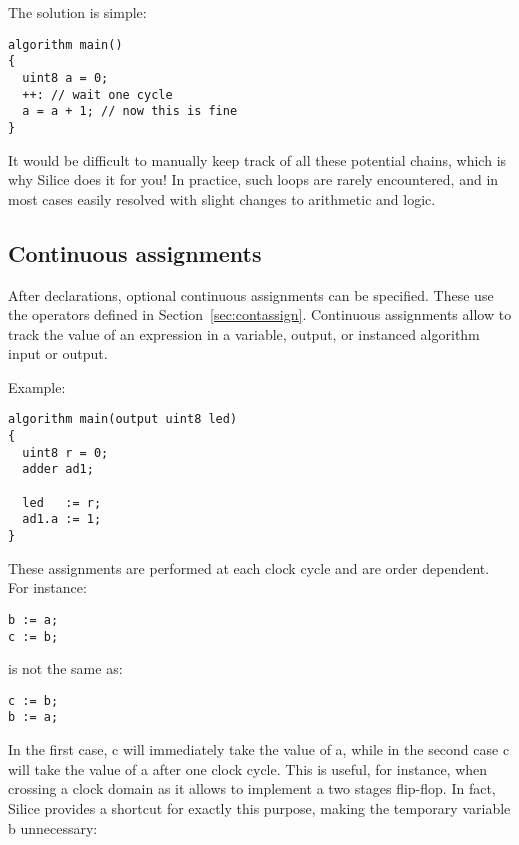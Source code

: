 \documentclass[a4]{article}
\newcommand\silice{Silice}
\begin{document}
\vspace*{2mm}
\noindent The solution is simple:
\begin{verbatim}
algorithm main()
{
  uint8 a = 0;
  ++: // wait one cycle
  a = a + 1; // now this is fine
}
\end{verbatim}

It would be difficult to manually keep track of all these potential chains, which is why \silice{} does it for you! In practice, such loops are rarely encountered, and in most cases easily resolved with slight changes to arithmetic and logic.

\vspace*{5mm}
\noindent
{}


\subsection{Continuous assignments}

After declarations, optional continuous assignments can be specified.
These use the operators defined in Section~\ref{sec:contassign}.
%
Continuous assignments allow to track the value of an expression
in a variable, output, or instanced algorithm input or output.

\noindent Example:
\begin{verbatim}
algorithm main(output uint8 led)
{
  uint8 r = 0;
  adder ad1;

  led   := r;
  ad1.a := 1;
}
\end{verbatim}

\noindent These assignments are performed at each clock cycle and are order dependent. For instance:
\begin{verbatim}
b := a;
c := b;
\end{verbatim}
is not the same as:
\begin{verbatim}
c := b;
b := a;
\end{verbatim}
In the first case, c will immediately take the value of a, while in the second case
c will take the value of a after one clock cycle. This is useful, for instance, when
crossing a clock domain as it allows to implement a two stages flip-flop. In fact,
\silice{} provides a shortcut for exactly this purpose, making the temporary variable b unnecessary:
\end{document}
